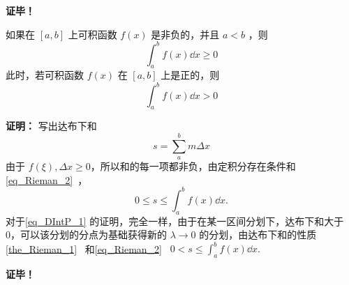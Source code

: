 \textbf{证毕！} 

\begin{theorem}{}
如果在 $[a,b]$ 上可积函数 $f(x)$ 是非负的，并且 $a<b$ ，则
\begin{equation}
\int_a^b f(x)\dd x\geq0
\end{equation}
此时，若可积函数 $f(x)$ 在 $[a,b]$ 上是正的，则
\begin{equation}\label{eq_DIntP_1}
\int_a^b f(x)\dd x>0
\end{equation}
\end{theorem}
\textbf{证明：}
写出达布下和
\begin{equation}
s=\sum_{a}^bm\Delta x
\end{equation}
由于 $f(\xi),\Delta x\geq0$，所以和的每一项都非负，由定积分存在条件和\autoref{eq_Rieman_2}~，
\begin{equation}
0\leq s\leq\int_a^b f(x)\dd x.
\end{equation}
对于\autoref{eq_DIntP_1} 的证明，完全一样，由于在某一区间分划下，达布下和大于0，可以该分划的分点为基础获得新的 $\lambda\rightarrow0$ 的分划，由达布下和的性质\autoref{the_Rieman_1}~ 和\autoref{eq_Rieman_2}~ 
$0<s\leq\int_a^b f(x)\dd x.$

\textbf{证毕！}